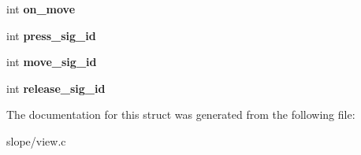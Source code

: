 \begin{DoxyCompactItemize}
\item 
\hypertarget{struct__SlopeViewPrivate_a956462aa9254d2beff0581b7449017c9}{int {\bfseries on\+\_\+move}}\label{struct__SlopeViewPrivate_a956462aa9254d2beff0581b7449017c9}

\item 
\hypertarget{struct__SlopeViewPrivate_a87e2e6ba1fa27e792bd82b8fb1658615}{int {\bfseries press\+\_\+sig\+\_\+id}}\label{struct__SlopeViewPrivate_a87e2e6ba1fa27e792bd82b8fb1658615}

\item 
\hypertarget{struct__SlopeViewPrivate_a027e97def0a6bde19c2e9ec2daa7a754}{int {\bfseries move\+\_\+sig\+\_\+id}}\label{struct__SlopeViewPrivate_a027e97def0a6bde19c2e9ec2daa7a754}

\item 
\hypertarget{struct__SlopeViewPrivate_a1c2d5d2faac3c86ad07877c415127580}{int {\bfseries release\+\_\+sig\+\_\+id}}\label{struct__SlopeViewPrivate_a1c2d5d2faac3c86ad07877c415127580}

\end{DoxyCompactItemize}


The documentation for this struct was generated from the following file\+:\begin{DoxyCompactItemize}
\item 
slope/view.\+c\end{DoxyCompactItemize}
